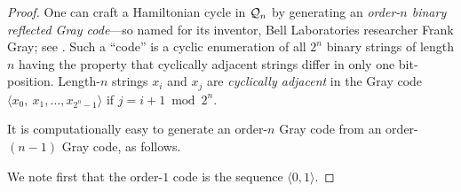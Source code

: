 \begin{proof}
One can craft a Hamiltonian cycle in $\mbox{$\cal Q$}_n$ by
generating an {\it order-$n$ binary reflected Gray code}---so named
for its inventor, Bell Laboratories researcher 
Frank Gray; see \cite{PetersonW81}.    Such a ``code'' is a cyclic enumeration of all
$2^n$ binary strings of length $n$ having the property that cyclically
adjacent  strings differ in only
one bit-position.  Length-$n$ strings $x_i$ and $x_j$ are {\it
  cyclically adjacent} in the Gray code $\langle x_0, \ x_1, \ldots,
x_{2^n-1} \rangle$ if $j = i+1 \bmod 2^n$.

\noindent
It is computationally easy to generate an order-$n$ Gray code from an
order-$(n-1)$ Gray code, as follows.

We note first that the order-$1$ code is the sequence $\langle 0, 1
\rangle$.


\end{proof}
